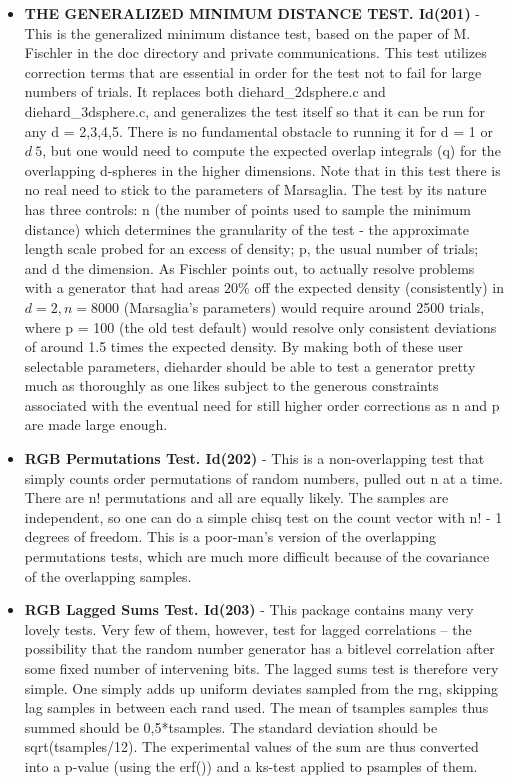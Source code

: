 \begin{itemize}
   \item \textbf{THE GENERALIZED MINIMUM DISTANCE TEST. Id(201)} - This is the generalized minimum distance test, based on the paper of M. Fischler in the doc directory and private communications.  This test utilizes correction terms that are essential in order for the test not to fail for large numbers of trials.  It replaces both diehard\_2dsphere.c and diehard\_3dsphere.c, and generalizes the test itself so that it can be run for any d = 2,3,4,5.  There is no fundamental obstacle to running it for d = 1 or $d\>5$, but one would need to compute the expected overlap integrals (q) for the overlapping d-spheres in the higher dimensions.  Note that in this test there is no real need to stick to the parameters of Marsaglia.  The test by its nature has three controls: n (the number of points used to sample the minimum distance) which determines the granularity of the test - the approximate length scale probed for an excess of density; p, the usual number of trials; and d the dimension.  As Fischler points out, to actually resolve problems with a generator that had areas $20\%$ off the expected density (consistently) in $d = 2, n = 8000$ (Marsaglia's parameters) would require around 2500 trials, where p = 100 (the old test default) would resolve only consistent deviations of around 1.5 times the expected density.  By making both of these user selectable parameters, dieharder should be able to test a generator pretty much as thoroughly as one likes subject to the generous constraints associated with the eventual need for still higher order corrections as n and p are made large enough.
   
   \item \textbf{RGB Permutations Test. Id(202)} -  This is a non-overlapping test that simply counts order permutations of random numbers, pulled out n at a time.  There are n! permutations and all are equally likely.  The samples are independent, so one can do a simple chisq test on the count vector with n! - 1 degrees of freedom.  This is a poor-man's version of the overlapping permutations tests, which are much more difficult because of the covariance of the overlapping samples.
   
   \item \textbf{RGB Lagged Sums Test. Id(203)} - This package contains many very lovely tests.  Very few of them, however, test for lagged correlations -- the possibility that the random number generator has a bitlevel correlation after some fixed number of intervening bits. The lagged sums test is therefore very simple.   One simply adds up uniform deviates sampled from the rng, skipping lag samples in between each rand used.  The mean of tsamples samples thus summed should be 0,5*tsamples.  The standard deviation should be sqrt(tsamples/12). The experimental values of the sum are thus converted into a p-value (using the erf()) and a ks-test applied to psamples of them.
   

\end{itemize}
